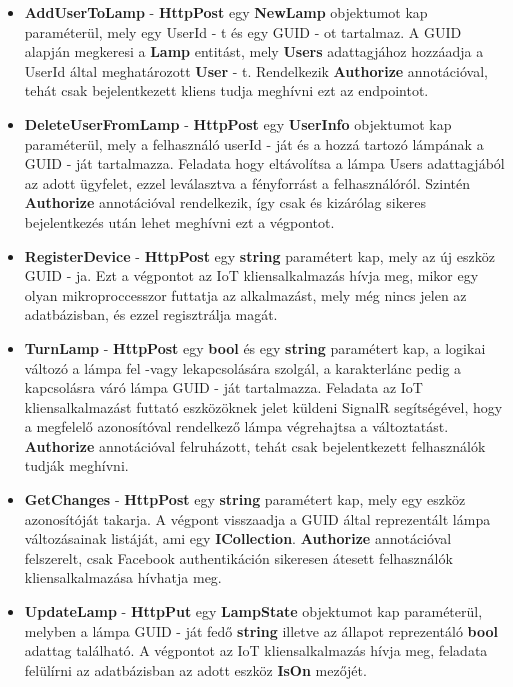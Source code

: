 \documentclass[a4paper,12pt]{report}
\begin{document}
\begin{itemize}
    \item \textbf{AddUserToLamp} - \textbf{HttpPost} egy \textbf{NewLamp} objektumot kap paraméterül, mely egy UserId - t és egy GUID - ot tartalmaz.
    A GUID alapján megkeresi a \textbf{Lamp} entitást, mely \textbf{Users} adattagjához hozzáadja a UserId által meghatározott \textbf{User} - t.
    Rendelkezik \textbf{Authorize} annotációval, tehát csak bejelentkezett kliens tudja meghívni ezt az endpointot.
    \item \textbf{DeleteUserFromLamp} - \textbf{HttpPost} egy \textbf{UserInfo} objektumot kap paraméterül, mely a felhasználó userId - ját és
    a hozzá tartozó lámpának a GUID - ját tartalmazza. Feladata hogy eltávolítsa a lámpa Users adattagjából az adott ügyfelet, ezzel leválasztva
    a fényforrást a felhasználóról. Szintén \textbf{Authorize} annotációval rendelkezik, így csak és kizárólag sikeres bejelentkezés után
    lehet meghívni ezt a végpontot.
    \item \textbf{RegisterDevice} - \textbf{HttpPost} egy \textbf{string} paramétert kap, mely az új eszköz GUID - ja. Ezt a végpontot
    az IoT kliensalkalmazás hívja meg, mikor egy olyan mikroproccesszor futtatja az alkalmazást, mely még nincs jelen az adatbázisban,
    és ezzel regisztrálja magát.
    \item \textbf{TurnLamp} - \textbf{HttpPost} egy \textbf{bool} és egy \textbf{string} paramétert kap, a logikai változó a lámpa fel -vagy lekapcsolására
    szolgál, a karakterlánc pedig a kapcsolásra váró lámpa GUID - ját tartalmazza. Feladata az IoT kliensalkalmazást futtató eszközöknek
    jelet küldeni SignalR segítségével, hogy a megfelelő azonosítóval rendelkező lámpa végrehajtsa a változtatást. \textbf{Authorize}
    annotációval felruházott, tehát csak bejelentkezett felhasználók tudják meghívni.
    \item \textbf{GetChanges} - \textbf{HttpPost} egy \textbf{string} paramétert kap, mely egy eszköz azonosítóját takarja. A végpont visszaadja
    a GUID által reprezentált lámpa változásainak listáját, ami egy \textbf{ICollection}. \textbf{Authorize} annotációval felszerelt, csak Facebook
    authentikáción sikeresen átesett felhasználók kliensalkalmazása hívhatja meg.
    \item \textbf{UpdateLamp} - \textbf{HttpPut} egy \textbf{LampState} objektumot kap paraméterül, melyben a lámpa GUID - ját fedő \textbf{string}
    illetve az állapot reprezentáló \textbf{bool} adattag található. A végpontot az IoT kliensalkalmazás hívja meg, feladata felülírni az adatbázisban
    az adott eszköz \textbf{IsOn} mezőjét.
\end{itemize}
\end{document}
